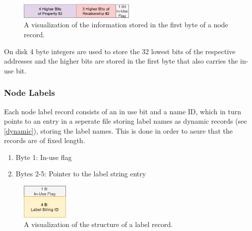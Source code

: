 \documentclass[a4paper,10pt]{article}
\begin{document}
    \begin{figure}[htp]\label{node_first_byte}
        \begin{center}
        \includegraphics[keepaspectratio,height=0.4\textheight,width=0.5\textwidth]{img/03_record/node/node_first_byte.png}
        \end{center}
        \caption{A visualization of the information stored in the first byte of a node record.} %
    \end{figure}
    
    On disk 4 byte integers are used to store the 32 lowest bits of the respective addresses and the higher bits are stored in the first byte that also carries the in-use bit.
    
    \subsubsection{Node Labels}
    Each node label record consists of an in use bit and a name ID, which in turn points to an entry in a seperate file storing label names as dynamic records (see \ref{dynamic}), storing the label names. This is done in order to asure that the records are of fixed length.
    \begin{enumerate}
     \item Byte 1: In-use flag
     \item Bytes 2-5: Pointer to the label string entry
    \end{enumerate}
    
    \begin{figure}[htp]\label{label_record}
        \begin{center}
            \includegraphics[keepaspectratio,height=0.2\textheight,width=0.2\textwidth]{img/03_record/node/label_record.png}
        \end{center}
        \caption{A visualization of the structure of a label record.} %
    \end{figure}
    
    
    
\end{document}
